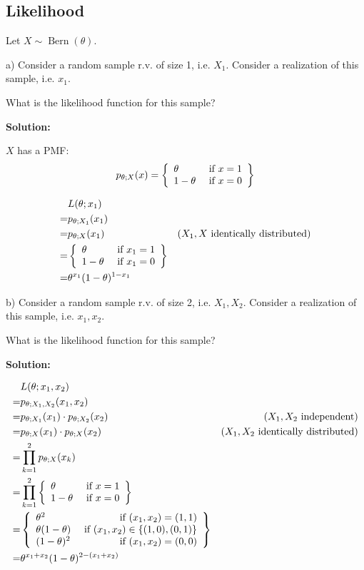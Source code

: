 \documentclass{article}
\begin{document}
\subsection{Likelihood}

\begin{sproblem}
Let \(X\sim \operatorname{Bern}(\theta)\).
\end{sproblem}

\begin{ssubproblem}
a)
Consider a random sample r.v. of size 1, i.e. \(X_1\).
Consider a realization of this sample, i.e. \(x_1\).

What is the likelihood function for this sample?
\end{ssubproblem}

\textbf{Solution:}
\begin{ssolution}

\(X\) has a PMF:
\[p_{\theta;X}(x) = \left\{\begin{array}{lr}\theta & \text{ if }x=1\\1-\theta & \text{ if }x=0\end{array}\right\}\]

\begin{align*}
     & L(\theta;x_1) \\
    =& p_{\theta;X_1}(x_1) \\
    =& p_{\theta;X}(x_1) & (X_1,X\text{ identically distributed}) \\
    =& \left\{\begin{array}{lr}\theta & \text{ if }x_1=1\\1-\theta & \text{ if }x_1=0\end{array}\right\} \\
    =& \theta^{x_1}(1-\theta)^{1-x_1}
\end{align*}
\end{ssolution}

\begin{ssubproblem}
b)
Consider a random sample r.v. of size 2, i.e. \(X_1, X_2\).
Consider a realization of this sample, i.e. \(x_1, x_2\).

What is the likelihood function for this sample?
\end{ssubproblem}

\textbf{Solution:}
\begin{ssolution}

\begin{align*}
     & L(\theta;x_1,x_2) \\
    =& p_{\theta;X_1,X_2}(x_1,x_2) \\
    =& p_{\theta;X_1}(x_1)\cdot p_{\theta;X_2}(x_2) & (X_1,X_2\text{ independent}) \\
    =& p_{\theta;X}(x_1)\cdot p_{\theta;X}(x_2) & (X_1,X_2\text{ identically distributed}) \\
    =& \prod_{k=1}^2 p_{\theta;X}(x_k) \\
    =& \prod_{k=1}^2 \left\{\begin{array}{lr}\theta & \text{ if }x=1\\1-\theta & \text{ if }x=0\end{array}\right\} \\
    =& \left\{\begin{array}{lr}\theta^2 & \text{ if }(x_1,x_2)=(1,1)\\ \theta(1-\theta) & \text{ if }(x_1,x_2)\in\{(1,0),(0,1)\} \\(1-\theta)^2 & \text{ if }(x_1,x_2)=(0,0)\end{array}\right\} \\
    =& \theta^{x_1+x_2}(1-\theta)^{2-(x_1+x_2)}
\end{align*}
\end{ssolution}
\end{document}
